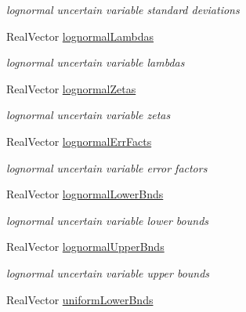 \begin{DoxyCompactItemize}
\begin{DoxyCompactList}\small\item\em lognormal uncertain variable standard deviations \end{DoxyCompactList}\item 
Real\+Vector \hyperlink{classPecos_1_1AleatoryDistParamsRep_aad813b58b3082502ffc21ea5592ed6c7}{lognormal\+Lambdas}\label{classPecos_1_1AleatoryDistParamsRep_aad813b58b3082502ffc21ea5592ed6c7}

\begin{DoxyCompactList}\small\item\em lognormal uncertain variable lambdas \end{DoxyCompactList}\item 
Real\+Vector \hyperlink{classPecos_1_1AleatoryDistParamsRep_addfdafa6afaad7b20d4fea2b49530433}{lognormal\+Zetas}\label{classPecos_1_1AleatoryDistParamsRep_addfdafa6afaad7b20d4fea2b49530433}

\begin{DoxyCompactList}\small\item\em lognormal uncertain variable zetas \end{DoxyCompactList}\item 
Real\+Vector \hyperlink{classPecos_1_1AleatoryDistParamsRep_ad0eb2956e8a3ba20a94c58077860a398}{lognormal\+Err\+Facts}\label{classPecos_1_1AleatoryDistParamsRep_ad0eb2956e8a3ba20a94c58077860a398}

\begin{DoxyCompactList}\small\item\em lognormal uncertain variable error factors \end{DoxyCompactList}\item 
Real\+Vector \hyperlink{classPecos_1_1AleatoryDistParamsRep_a4c7250fef7bf8ba6a13a5311017267c2}{lognormal\+Lower\+Bnds}\label{classPecos_1_1AleatoryDistParamsRep_a4c7250fef7bf8ba6a13a5311017267c2}

\begin{DoxyCompactList}\small\item\em lognormal uncertain variable lower bounds \end{DoxyCompactList}\item 
Real\+Vector \hyperlink{classPecos_1_1AleatoryDistParamsRep_a1414f0cf25556522e0a8331698b7958f}{lognormal\+Upper\+Bnds}\label{classPecos_1_1AleatoryDistParamsRep_a1414f0cf25556522e0a8331698b7958f}

\begin{DoxyCompactList}\small\item\em lognormal uncertain variable upper bounds \end{DoxyCompactList}\item 
Real\+Vector \hyperlink{classPecos_1_1AleatoryDistParamsRep_a9d87e1b70193ca40352678c7a850e4b1}{uniform\+Lower\+Bnds}\label{classPecos_1_1AleatoryDistParamsRep_a9d87e1b70193ca40352678c7a850e4b1}


\end{DoxyCompactItemize}
